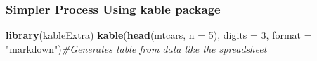 \documentclass[
]{article}
\newenvironment{Shaded}{\begin{snugshade}}{\end{snugshade}}
\newcommand{\AttributeTok}[1]{\textcolor[rgb]{0.13,0.29,0.53}{#1}}
\newcommand{\CommentTok}[1]{\textcolor[rgb]{0.56,0.35,0.01}{\textit{#1}}}
\newcommand{\DecValTok}[1]{\textcolor[rgb]{0.00,0.00,0.81}{#1}}
\newcommand{\FunctionTok}[1]{\textcolor[rgb]{0.13,0.29,0.53}{\textbf{#1}}}
\newcommand{\NormalTok}[1]{#1}
\newcommand{\StringTok}[1]{\textcolor[rgb]{0.31,0.60,0.02}{#1}}
\begin{document}
\subsubsection{Simpler Process Using kable
package}\label{simpler-process-using-kable-package}

\begin{Shaded}
\begin{Highlighting}[]
\FunctionTok{library}\NormalTok{(kableExtra)}
\FunctionTok{kable}\NormalTok{(}\FunctionTok{head}\NormalTok{(mtcars, }\AttributeTok{n =} \DecValTok{5}\NormalTok{), }\AttributeTok{digits =} \DecValTok{3}\NormalTok{, }\AttributeTok{format =} \StringTok{"markdown"}\NormalTok{)}\CommentTok{\#Generates table from data like the spreadsheet}
\end{Highlighting}
\end{Shaded}
\end{document}
